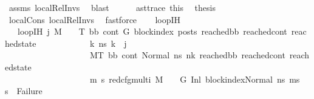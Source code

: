 \begin{isabellebody}
\ assms{\isacharparenleft}{\kern0pt}{}{\isacharparenright}{\kern0pt}\ local{\isachardot}{\kern0pt}Rel{\isacharunderscore}{\kern0pt}Invs\ \isamarkupfalse%
\ blast\isanewline
\ \ \ \ \isamarkupfalse%
\ ast{\isacharunderscore}{\kern0pt}trace\ this\ \isamarkupfalse%
\ {\isacharquery}{\kern0pt}thesis\isanewline
\ \ \ \ \ \ \isamarkupfalse%
\ local{\isachardot}{\kern0pt}Cons\ local{\isachardot}{\kern0pt}Rel{\isacharunderscore}{\kern0pt}Invs{\isacharparenleft}{\kern0pt}{}{\isacharparenright}{\kern0pt}\ \isamarkupfalse%
\ fastforce\isanewline
\ \ \isamarkupfalse%
\isanewline
{}\isamarkupfalse%
%
\endisatagproof
{\isafoldproof}%
%
\isadelimproof
\isanewline
%
\endisadelimproof
\isanewline
{}\isamarkupfalse%
\ loop{\isacharunderscore}{\kern0pt}IH\ \isanewline
\ \ \ {\isachardoublequoteopen}loop{\isacharunderscore}{\kern0pt}IH\ j\ M\ {\isasymLambda}\ {\isasymGamma}\ {\isasymOmega}\ T\ bb{}\ cont{}\ G\ block{\isacharunderscore}{\kern0pt}index\ posts\ reached{\isacharunderscore}{\kern0pt}bb\ reached{\isacharunderscore}{\kern0pt}cont\ reached{\isacharunderscore}{\kern0pt}state\ {\isasymequiv}\ \isanewline
\ \ \ \ \ \ \ \ \ \ {\isacharparenleft}{\kern0pt}{\isasymforall}k\ ns{}{\isachardot}{\kern0pt}\ k\ {\isacharless}{\kern0pt}\ j\ {\isasymlongrightarrow}\isanewline
\ \ \ \ \ \ \ \ \ \ \ \ \ \ \ \ \ \ \ \ {\isacharparenleft}{\kern0pt}M{\isacharcomma}{\kern0pt}{\isasymLambda}{\isacharcomma}{\kern0pt}{\isasymGamma}{\isacharcomma}{\kern0pt}{\isasymOmega}{\isacharcomma}{\kern0pt}T\ {\isasymturnstile}{\isacharparenleft}{\kern0pt}bb{}{\isacharcomma}{\kern0pt}\ cont{}{\isacharcomma}{\kern0pt}\ Normal\ ns{}{\isacharparenright}{\kern0pt}\ {\isacharminus}{\kern0pt}n{\isasymlongrightarrow}{\isacharcircum}{\kern0pt}k\ {\isacharparenleft}{\kern0pt}reached{\isacharunderscore}{\kern0pt}bb{\isacharcomma}{\kern0pt}\ reached{\isacharunderscore}{\kern0pt}cont{\isacharcomma}{\kern0pt}\ reached{\isacharunderscore}{\kern0pt}state{\isacharparenright}{\kern0pt}{\isacharparenright}{\kern0pt}\ {\isasymlongrightarrow}\isanewline
\ \ \ \ \ \ \ \ \ \ \ \ \ \ \ \ \ \ \ \ {\isacharparenleft}{\kern0pt}{\isasymforall}m{\isacharprime}{\kern0pt}\ s{\isacharprime}{\kern0pt}{\isachardot}{\kern0pt}\ {\isacharparenleft}{\kern0pt}red{\isacharunderscore}{\kern0pt}cfg{\isacharunderscore}{\kern0pt}multi\ M\ {\isasymLambda}\ {\isasymGamma}\ {\isasymOmega}\ G\ {\isacharparenleft}{\kern0pt}{\isacharparenleft}{\kern0pt}Inl\ block{\isacharunderscore}{\kern0pt}index{\isacharparenright}{\kern0pt}{\isacharcomma}{\kern0pt}{\isacharparenleft}{\kern0pt}Normal\ ns{}{\isacharparenright}{\kern0pt}{\isacharparenright}{\kern0pt}\ {\isacharparenleft}{\kern0pt}m{\isacharprime}{\kern0pt}{\isacharcomma}{\kern0pt}s{\isacharprime}{\kern0pt}{\isacharparenright}{\kern0pt}{\isacharparenright}{\kern0pt}\ {\isasymlongrightarrow}\ {\isacharparenleft}{\kern0pt}s{\isacharprime}{\kern0pt}\ {\isasymnoteq}\ Failure{\isacharparenright}{\kern0pt}{\isacharparenright}{\kern0pt}\ {\isasymlongrightarrow}\isanewline

\end{isabellebody}
